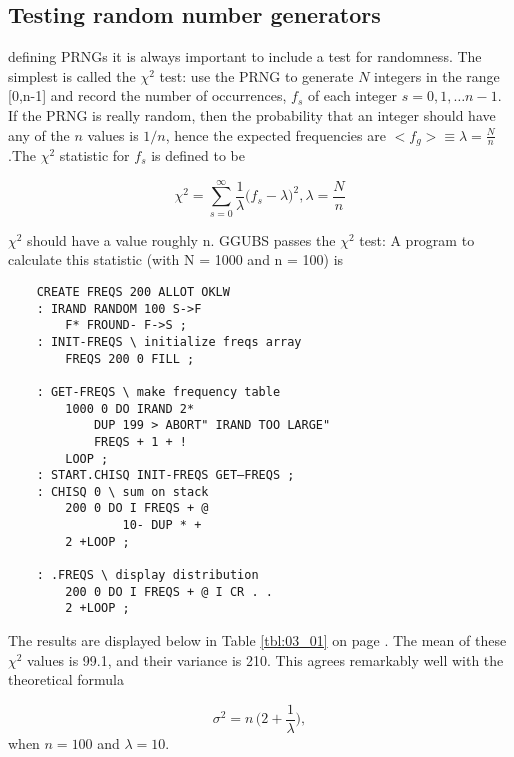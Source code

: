 
\subsection{Testing random number generators}
 defining PRNGs it is always important to include a test
for randomness. The simplest is called the $\chi^2$ test: use the
PRNG to generate $N$ integers in the range [0,n-1] and record
the number of occurrences, $f_s$ of each integer $s = 0, 1, \dots n-1$. If
the PRNG is really random, then the probability that an integer
should have any of the $n$ values is $1/n$, hence the expected 
frequencies are $<f_g> \equiv \lambda = \frac{N}{n}$ .The $\chi^2$ statistic for $f_s$ is defined to
be

\begin{equation}
\chi^2=\sum_{s=0}^{\infty}\frac{1}{\lambda}\Big(f_s-\lambda\Big)^2, \lambda=\frac{N}{n} %
\end{equation}


$\chi^2$ should have a value roughly n. GGUBS passes the $\chi^2$ test: A
program to calculate this statistic (with N = 1000 and n = 100) is

\begin{verbatim}
    CREATE FREQS 200 ALLOT OKLW
    : IRAND RANDOM 100 S->F
        F* FROUND- F->S ;
    : INIT-FREQS \ initialize freqs array
        FREQS 200 0 FILL ;

    : GET-FREQS \ make frequency table
        1000 0 DO IRAND 2*
            DUP 199 > ABORT" IRAND TOO LARGE"
            FREQS + 1 + !
        LOOP ;
    : START.CHISQ INIT-FREQS GET—FREQS ;
    : CHISQ 0 \ sum on stack
        200 0 DO I FREQS + @
                10- DUP * +
        2 +LOOP ;

    : .FREQS \ display distribution
        200 0 DO I FREQS + @ I CR . . 
        2 +LOOP ;
\end{verbatim}
 


The results are displayed below in Table \ref{tbl:03_01} on page \pageref{tbl:03_01}. The mean
of these $\chi^2$ values is 99.1, and their variance is 210. This agrees
remarkably well with the theoretical formula

\begin{equation*}
    \sigma^2=n \, \Big(2+\frac{1}{\lambda}\Big),
\end{equation*}
when $n = 100$ and $\lambda = 10$.

